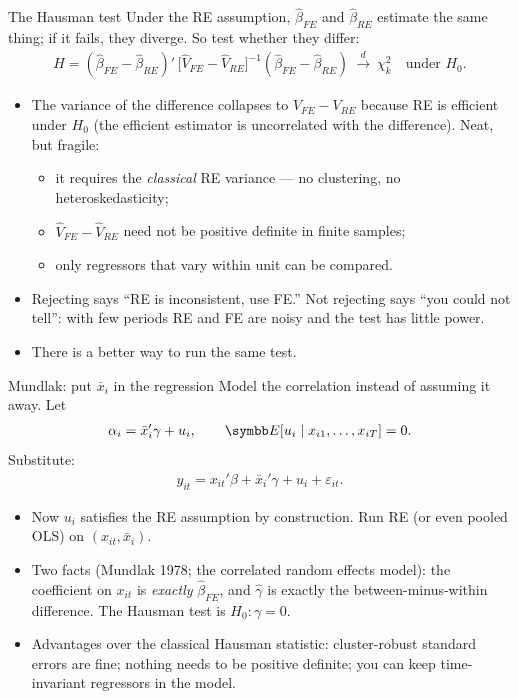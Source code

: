 \documentclass[aspectratio=169,11pt]{beamer}
\begin{document}
\begin{frame}{The Hausman test}
Under the RE assumption, $\hat\beta_{FE}$ and $\hat\beta_{RE}$ estimate the same thing;
if it fails, they diverge. So test whether they differ:
\begin{align*}
	H = (\hat\beta_{FE} - \hat\beta_{RE})'\,\big[\hat V_{FE} - \hat V_{RE}\big]^{-1}(\hat\beta_{FE} - \hat\beta_{RE})
	\ \xrightarrow{d}\ \chi^2_k \quad \text{under } H_0 .
\end{align*}
\begin{itemize}
	\item The variance of the difference collapses to $V_{FE} - V_{RE}$ because RE is efficient
	under $H_0$ (the efficient estimator is uncorrelated with the difference). Neat, but fragile:
	\begin{itemize}
		\item it requires the \emph{classical} RE variance --- no clustering, no heteroskedasticity;
		\item $\hat V_{FE} - \hat V_{RE}$ need not be positive definite in finite samples;
		\item only regressors that vary within unit can be compared.
	\end{itemize}
	\medskip
	\item Rejecting says ``RE is inconsistent, use FE.'' Not rejecting says ``you could not tell'':
	with few periods RE and FE are noisy and the test has little power.
	\medskip
	\item There is a better way to run the same test.
\end{itemize}
\end{frame}


\begin{frame}{Mundlak: put $\bar x_i$ in the regression}
Model the correlation instead of assuming it away. Let
\begin{align*}
	\alpha_i = \bar x_i'\gamma + u_i, \qquad \E[u_i \mid x_{i1},\dots,x_{iT}] = 0 .
\end{align*}
Substitute:
\begin{align*}
	y_{it} = x_{it}'\beta + \bar x_i'\gamma + u_i + \varepsilon_{it} .
\end{align*}
\begin{itemize}
	\item Now $u_i$ satisfies the RE assumption by construction. Run RE (or even pooled OLS) on
	$(x_{it}, \bar x_i)$.
	\medskip
	\item Two facts (Mundlak 1978; the \alert{correlated random effects} model): the coefficient on $x_{it}$ is \emph{exactly} $\hat\beta_{FE}$,
	and $\hat\gamma$ is exactly the between-minus-within difference. The Hausman test is $H_0: \gamma = 0$.
	\medskip
	\item Advantages over the classical Hausman statistic: cluster-robust standard errors are fine;
	nothing needs to be positive definite; you can keep time-invariant regressors in the model.
\end{itemize}
\end{frame}
\end{document}
